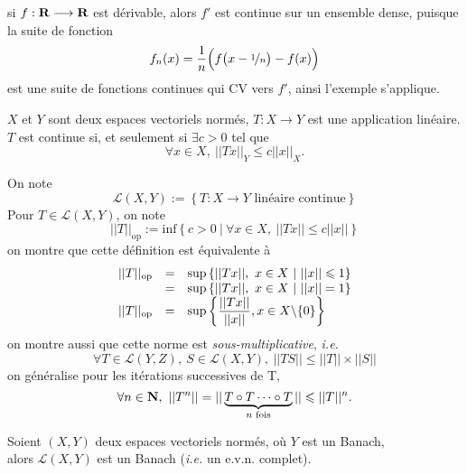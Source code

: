 \documentclass[a4paper,11pt, twoside]{article}
\begin{document}
\begin{RQ}
  si $f:\mathbf R\longrightarrow \mathbf R$ est dérivable, alors $f'$ est continue sur un ensemble dense, puisque la suite de fonction 
  $$f_n(x)=\frac{1}{n}\Big(f\big(x-\nicefrac{1}{n}\big)-f(x)\Big)$$
  est une suite de fonctions continues qui CV vers $f'$, ainsi l'exemple s'applique.
\end{RQ}





$X$ et $Y$ sont deux espaces vectoriels normés, $T:X\longrightarrow Y$ est une application linéaire.\\[1em]

$T$ est continue si, et seulement si $\exists c>0$ tel que
$$\forall x\in X,\ ||Tx||_Y\leqslant c||x||_X.$$

On note 
$$\mathcal L(X,Y):=\left\{T:X\longrightarrow Y\text{ linéaire continue}\right\}$$
Pour $T\in\mathcal L(X,Y)$, on note
$$||T||_{\mathrm{op}}:=\mathrm{inf}\left\{c>0\ |\ \forall x\in X,\ ||Tx||\leqslant c||x||\right\}$$
on montre que cette définition est équivalente à
$$\begin{array}{rcl}
||T||_{\mathrm{op}}&=&\mathrm{sup}\left\{||Tx||,\ x\in X\ |\ ||x||\leqslant 1\right\}\\
&=&\mathrm{sup}\left\{||Tx||,\ x\in X\ |\ ||x||= 1\right\}\\
||T||_{\mathrm{op}}&=&\mathrm{sup}\left\{\dstyle\frac{||Tx||}{||x||}, x\in X\backslash\{0\}\right\}
\end{array}$$
on montre aussi que cette norme est \emph{sous-multiplicative}, \emph{i.e.}
$$\forall T\in\mathcal L(Y,Z),\ S\in\mathcal L(X,Y),\ ||TS||\leqslant ||T||\times ||S||$$
on généralise pour les itérations successives de T,
$$\forall n\in\mathbf N,\ ||T^n||=||\underbrace{T\circ T\cdots\circ T}_{n\text{ fois}}||\leqslant ||T||^n.$$

\begin{prop}
  Soient $(X,Y)$ deux espaces vectoriels normés, où $Y$ est un Banach,\\

  alors $\mathcal L(X,Y)$ est un Banach (\emph{i.e.} un e.v.n. complet).
\end{prop}
\end{document}
